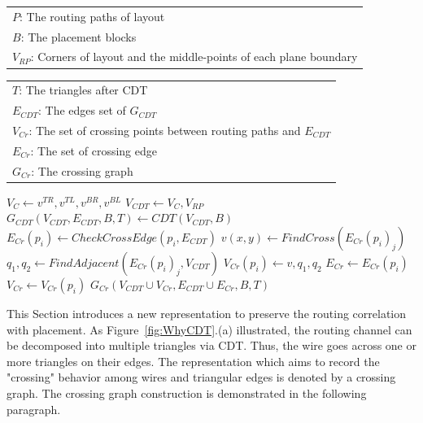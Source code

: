     \newcommand{\CCG}{\ensuremath{\mbox{\sc ConstCrossGraph}}}
    \begin{algorithm}[hbt]  
      \caption{$\CCG(P,B,V_{RP})$}\label{alg:CCG}                       
      \begin{scriptsize}
        \begin{algorithmic}[1]
          \REQUIRE 
            \begin{tabular}{l}
              $P$: The routing paths of layout\\
              $B$: The placement blocks \\
              $V_{RP}$: Corners of layout and the middle-points of each plane boundary\\ 
            \end{tabular}
          \ENSURE 
            \begin{tabular}{l}
              $T$: The triangles after CDT\\
              $E_{CDT}$: The edges set of $G_{CDT}$\\
              $V_{Cr}$: The set of crossing points between routing paths and $E_{CDT}$\\
              $E_{Cr}$: The set of crossing edge\\
              $G_{Cr}$: The crossing graph
            \end{tabular}
            \STATE $V_C \gets v^{TR},v^{TL},v^{BR},v^{BL} $ 
          \ENDFOR
          \STATE $V_{CDT}\gets V_C, V_{RP}$  \label{line:VCDT}
          \STATE $G_{CDT}(V_{CDT},E_{CDT},B,T) \gets CDT(V_{CDT},B)$   \label{line:GCDT}
           \label{line:StartCross}
            \STATE $E_{Cr}(p_i) \gets CheckCrossEdge(p_i,E_{CDT})$
              \STATE $v(x,y) \gets FindCross({E_{Cr}(p_i)}_j)$
              \STATE $q_1,q_2 \gets FindAdjacent({E_{Cr}(p_i)}_j,V_{CDT})$
              \STATE $V_{Cr}(p_i) \gets v,q_1,q_2$
            \ENDFOR
            \STATE $E_{Cr} \gets E_{Cr}(p_i)$
            \STATE $V_{Cr} \gets V_{Cr}(p_i)$
          \ENDFOR \label{line:EndCross}
          \RETURN $G_{Cr}(V_{CDT}\cup V_{Cr}, E_{CDT} \cup E_{Cr},B,T)$  
        \end{algorithmic}
      \end{scriptsize} 
    \end{algorithm}

    This Section introduces a new representation to preserve the routing correlation with placement. As Figure~\ref{fig:WhyCDT}.(a) illustrated, the routing channel can be decomposed into multiple triangles via CDT. Thus, the wire goes across one or more triangles on their edges. The representation which aims to record the "crossing" behavior among wires and triangular edges is denoted by a crossing graph. The crossing graph construction is demonstrated in the following paragraph. 


